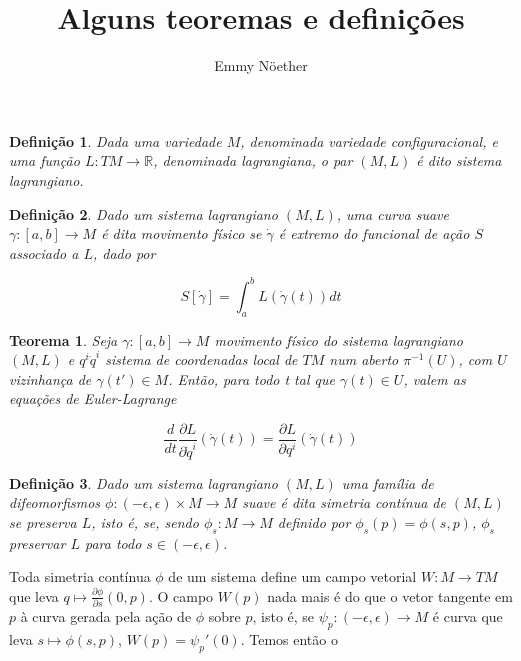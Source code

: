 \documentclass[12pt, a4paper]{article}
\title{Alguns teoremas e definições}
\author{Emmy Nöether}
\date{}
\newtheorem{teorema}{Teorema }
\newtheorem{definicao}{Definição }
\begin{document}
\maketitle

\begin{definicao} Dada uma variedade $M$, denominada variedade configuracional, e uma função $L: TM \rightarrow \mathbb{R}$, denominada lagrangiana, o par $(M, L)$ é dito sistema lagrangiano.
\end{definicao}

\begin{definicao} Dado um sistema lagrangiano $(M, L)$, uma curva suave $\gamma: [a, b] \rightarrow M$ é dita movimento físico se $\dot{\gamma}$ é extremo do funcional de ação $S$ associado a $L$, dado por

\[ S[\dot{\gamma}] = \int_a^b L(\dot{\gamma}(t))dt \]
\end{definicao}

\begin{teorema} Seja $\gamma: [a, b] \rightarrow M$ movimento físico do sistema lagrangiano $(M, L)$ e ${q^i \dot{q}^i}$ sistema de coordenadas local de $TM$ num aberto $\pi^{-1}(U)$, com $U$ vizinhança de $\gamma(t') \in M$. Então, para todo t tal que $\gamma(t) \in U$, valem as equações de Euler-Lagrange

\[ \frac{d}{dt} \frac{\partial L}{\partial \dot{q}^i}(\dot{\gamma}(t)) = \frac{\partial L}{\partial q^i}(\dot{\gamma}(t)) \]

\end{teorema}

\begin{definicao} Dado um sistema lagrangiano $(M, L)$ uma família de difeomorfismos $\phi: (-\epsilon, \epsilon)\times M\rightarrow M$ suave é dita simetria contínua de $(M, L)$ se preserva $L$, isto é, se, sendo $\phi_s: M \rightarrow M$ definido por $\phi_s(p) = \phi(s, p)$, $\phi_s$ preservar $L$ para todo $s \in (-\epsilon, \epsilon)$.
\end{definicao}

Toda simetria contínua $\phi$ de um sistema define um campo vetorial $W: M \rightarrow TM$ que leva $q \mapsto \frac{\partial \phi}{\partial s}(0, p)$. O campo $W(p)$ nada mais é do que o vetor tangente em $p$ à curva gerada pela ação de $\phi$ sobre $p$, isto é, se $\psi_p : (-\epsilon, \epsilon) \rightarrow M$ é curva que leva $s \mapsto \phi(s, p)$, $W(p) = \psi_p'(0)$.  Temos então o
\end{document}
